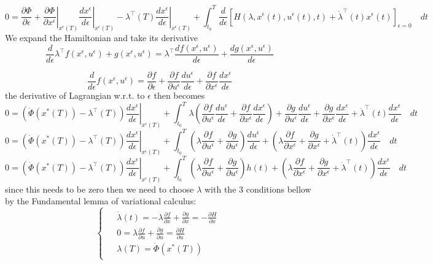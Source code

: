 \documentclass{article}
\begin{document}
\[
0 = \frac{\partial \Phi}{\partial \epsilon}+\left.\frac{\partial \Phi}{\partial x^\epsilon}\right|_{x^\epsilon(T)}\left.\frac{d x^\epsilon}{d \epsilon}\right|_{x^\epsilon(T)}
- \lambda^{{\top}}(T)\left.\frac{d x^\epsilon}{d \epsilon}\right|_{x^\epsilon(T)} + \int^T_{t_0}{\frac{d}{d\epsilon}\left[H(\lambda, x^\epsilon(t), u^\epsilon(t), t) + \dot{\lambda}^{{\top}}(t)x^\epsilon(t)\right]_{\epsilon=0} \quad dt }
\]
We expand the Hamiltonian and take its derivative
\[
\frac{d}{d\epsilon} \lambda^{{\top}} f(x^\epsilon, u^\epsilon)+g(x^\epsilon, u^\epsilon) = \lambda^{{\top}} \frac{d f(x^\epsilon, u^\epsilon)}{d\epsilon} + \frac{d g(x^\epsilon, u^\epsilon)}{d\epsilon}
\]

\[
\frac{d}{d\epsilon}f(x^\epsilon,u^\epsilon) = 
\frac{\partial f}{\partial \epsilon} 
+ \frac{\partial f}{\partial u^\epsilon}   \frac{du^\epsilon}{d\epsilon} 
+ \frac{\partial f}{\partial x^\epsilon}   \frac{dx^\epsilon}{d\epsilon}
\]
the derivative of Lagrangian w.r.t. to $\epsilon$ then becomes
\[
0 = \left(\dot{\Phi}(x^*(T))
- \lambda^{{\top}}(T)\right)\left.\frac{d x^\epsilon}{d \epsilon}\right|_{x^\epsilon(T)} + \int^T_{t_0}{ \lambda \left( \frac{\partial f}{\partial u^\epsilon} \frac{du^\epsilon}{d\epsilon} 
+ \frac{\partial f}{\partial x^\epsilon}   \frac{dx^\epsilon}{d\epsilon} \right)
+ \frac{\partial g}{\partial u^\epsilon}   \frac{du^\epsilon}{d\epsilon} 
+ \frac{\partial g}{\partial x^\epsilon}   \frac{dx^\epsilon}{d\epsilon} 
+ \dot{\lambda}^{{\top}}(t)\frac{dx^\epsilon}{d\epsilon} \quad dt }
\]
\[
0 = \left(\dot{\Phi}(x^*(T))
- \lambda^{{\top}}(T)\right)\left.\frac{d x^\epsilon}{d \epsilon}\right|_{x^\epsilon(T)} + \int^T_{t_0}{ \left( \lambda \frac{\partial f}{\partial u^\epsilon}
+ \frac{\partial g}{\partial u^\epsilon}\right)   
\frac{du^\epsilon}{d\epsilon} 
+ \left(\lambda \frac{\partial f}{\partial x^\epsilon}  
+ \frac{\partial g}{\partial x^\epsilon} 
+ \dot{\lambda}^{{\top}}(t)\right)
\frac{dx^\epsilon}{d\epsilon} \quad dt }
\]
\[
0 = \left(\dot{\Phi}(x^*(T))
- \lambda^{{\top}}(T)\right)\left.\frac{d x^\epsilon}{d \epsilon}\right|_{x^\epsilon(T)} + 
\int^T_{t_0}{ 
\left( \lambda \frac{\partial f}{\partial u^\epsilon}
+ \frac{\partial g}{\partial u^\epsilon}\right)   
h(t)
+ \left(\lambda \frac{\partial f}{\partial x^\epsilon}  
+ \frac{\partial g}{\partial x^\epsilon} 
+ \dot{\lambda}^{{\top}}(t)\right)
\frac{dx^\epsilon}{d\epsilon} \quad dt }
\]
since this needs to be zero then we need to choose $\lambda$ with the 3 conditions bellow by the Fundamental lemma of variational calculus:
\[
\left\{\begin{array}{l}
\begin{aligned}
& \dot{\lambda}(t) = 
- \lambda \frac{\partial f}{\partial x}  
+ \frac{\partial g}{\partial x} 
= -\frac{\partial H}{\partial x}\\
& 0 = \lambda \frac{\partial f}{\partial u}  
+ \frac{\partial g}{\partial u} = \frac{\partial H}{\partial u}\\
& \lambda(T) = \dot{\Phi}(x^*(T))
\end{aligned}
\end{array}\right.
\label{eq:optimal_control_loss}
\]
\end{document}
